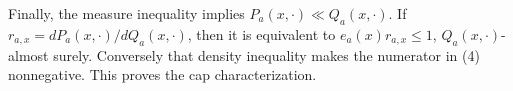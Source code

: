 Finally, the measure inequality implies \(P_a(x,\cdot)\ll Q_a(x,\cdot)\).  If \(r_{a,x}=dP_a(x,\cdot)/dQ_a(x,\cdot)\), then it is equivalent to \(e_a(x)r_{a,x}\le1\), \(Q_a(x,\cdot)\)-almost surely.  Conversely that density inequality makes the numerator in (4) nonnegative.  This proves the cap characterization.
